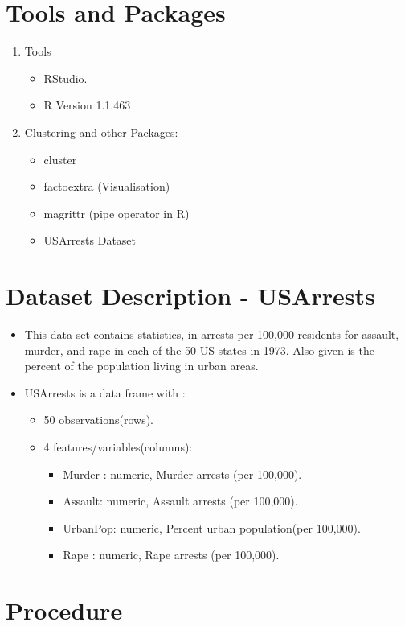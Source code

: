 \documentclass[a4paper,10pt]{article}
\begin{document}
\pagebreak
\section{Tools and Packages}
\begin{enumerate}
	\item Tools
	\begin{itemize}
		\item RStudio.
		\item R Version 1.1.463
	\end{itemize}
	\item Clustering and other Packages:
	\begin{itemize}
		\item cluster
		\item factoextra (Visualisation)
		\item magrittr (pipe operator in R)
		\item USArrests Dataset 
	\end{itemize}				
\end{enumerate}

\section{Dataset Description - USArrests}
\begin{itemize}
	\item This data set contains statistics, in arrests per 100,000 residents for assault, murder, and rape in each of the 50 US states in 1973. Also given is the percent of the population living in urban areas. 
	
	\item USArrests is a data frame with :
	\begin{itemize}
		\item 50 observations(rows).
		\item 4 features/variables(columns):
		\begin{itemize}
			\item Murder :  numeric, Murder arrests (per 100,000).
			\item Assault:  numeric, Assault arrests (per 100,000).
			\item UrbanPop: numeric, Percent urban population(per 100,000).
			\item Rape    : numeric, Rape arrests (per 100,000). 
		\end{itemize}
	\end{itemize} 	
\end{itemize}
\section{Procedure}
\end{document}
